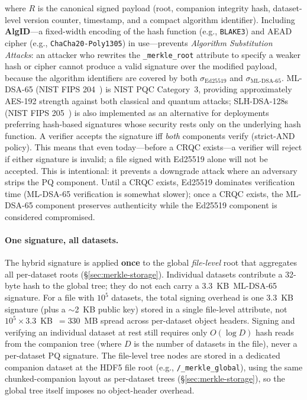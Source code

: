 \documentclass[11pt]{article}
\begin{document}
\noindent where $R$ is the canonical signed payload (root, companion integrity
hash, dataset-level version counter, timestamp, and a compact algorithm
identifier). Including \textbf{AlgID}---a fixed-width encoding of the hash
function (e.g., \texttt{BLAKE3}) and AEAD cipher (e.g.,
\texttt{ChaCha20-Poly1305}) in use---prevents \emph{Algorithm Substitution
Attacks}: an attacker who rewrites the \texttt{\_merkle\_root} attribute to
specify a weaker hash or cipher cannot produce a valid signature over the
modified payload, because the algorithm identifiers are covered by both
$\sigma_\text{Ed25519}$ and $\sigma_\text{ML-DSA-65}$. ML-DSA-65 (NIST FIPS
204~\cite{fips204}) is NIST PQC Category~3, providing approximately AES-192
strength against both classical and quantum attacks; SLH-DSA-128s (NIST FIPS 205~\cite{fips205}) is also
implemented as an alternative for deployments preferring hash-based
signatures whose security rests only on the underlying hash function. A
verifier accepts the signature iff \emph{both} components verify
(strict-AND policy). This means that even today---before a CRQC exists---a
verifier will reject if either signature is invalid; a file signed with
Ed25519 alone will not be accepted. This is intentional: it prevents a
downgrade attack where an adversary strips the PQ component. Until a CRQC
exists, Ed25519 dominates verification time (ML-DSA-65 verification is
somewhat slower); once a CRQC exists, the ML-DSA-65 component preserves
authenticity while the Ed25519 component is considered compromised.

\paragraph{One signature, all datasets.}
The hybrid signature is applied \textbf{once} to the global
\emph{file-level} root that aggregates all per-dataset roots
(\S\ref{sec:merkle-storage}). Individual datasets contribute a
32-byte hash to the global tree; they do not each carry a
3.3~KB~ML-DSA-65 signature. For a file with $10^5$ datasets,
the total signing overhead is one 3.3~KB signature (plus a $\sim$2~KB
public key) stored in a single file-level attribute, not $10^5 \times
3.3$~KB~$= 330$~MB spread across per-dataset object headers. Signing
and verifying an individual dataset at rest still requires only
$O(\log D)$ hash reads from the companion tree (where $D$ is the
number of datasets in the file), never a per-dataset PQ signature.
The file-level tree nodes are stored in a dedicated companion dataset
at the HDF5 file root (e.g., \texttt{/\_merkle\_global}), using the
same chunked-companion layout as per-dataset trees (\S\ref{sec:merkle-storage}),
so the global tree itself imposes no object-header overhead.
\end{document}
